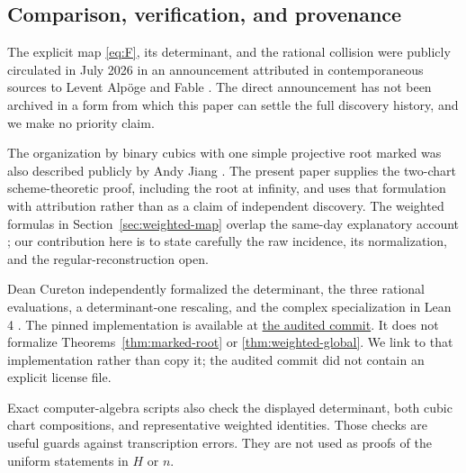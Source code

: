 \subsection{Comparison, verification, and provenance}

The explicit map \eqref{eq:F}, its determinant, and the rational collision
were publicly circulated in July 2026 in an announcement attributed in
contemporaneous sources to Levent Alp\"oge and Fable
\cite{alpoge-announcement,gallagher-explainer,zhang-consequences}.  The direct
announcement has not been archived in a form from which this paper can settle
the full discovery history, and we make no priority claim.

The organization by binary cubics with one simple projective root marked was
also described publicly by Andy Jiang \cite{jiang-marked-root}.  The present
paper supplies the two-chart scheme-theoretic proof, including the root at
infinity, and uses that formulation with attribution rather than as a claim
of independent discovery.  The weighted formulas in
Section~\ref{sec:weighted-map} overlap the same-day explanatory account
\cite{gallagher-explainer}; our contribution here is to state carefully the
raw incidence, its normalization, and the regular-reconstruction open.

Dean Cureton independently formalized the determinant, the three rational
evaluations, a determinant-one rescaling, and the complex specialization in
Lean 4 \cite{cureton-lean}.  The pinned implementation is available at
\href{https://github.com/deancureton/jacobian/commit/0d4a9212d874226ad81ce5a926becddfa94e6a88}{the audited commit}.
It does not formalize Theorems~\ref{thm:marked-root} or
\ref{thm:weighted-global}.  We link to that implementation rather than copy
it; the audited commit did not contain an explicit license file.

Exact computer-algebra scripts also check the displayed determinant, both
cubic chart compositions, and representative weighted identities.  Those
checks are useful guards against transcription errors.  They are not used as
proofs of the uniform statements in $H$ or $n$.
